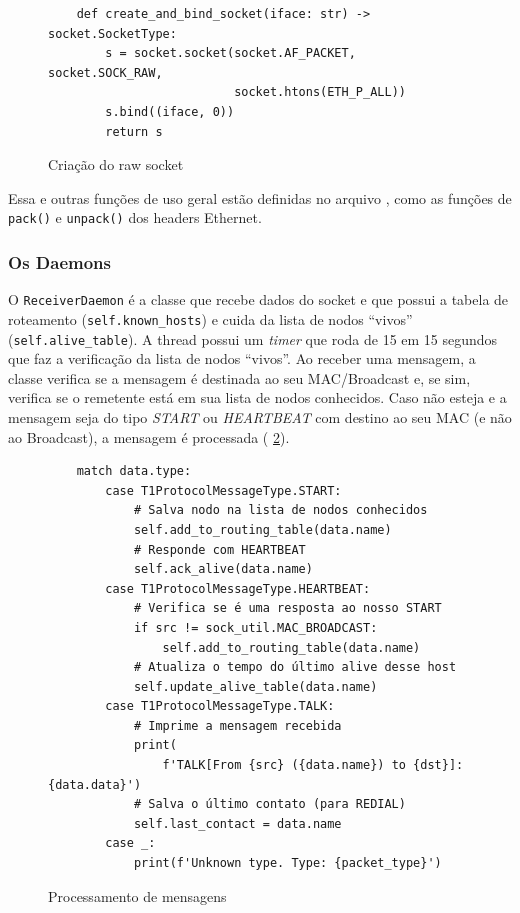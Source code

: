 \begin{figure}[H]
    \centering
\begin{verbatim}
    def create_and_bind_socket(iface: str) -> socket.SocketType:
        s = socket.socket(socket.AF_PACKET, socket.SOCK_RAW,
                          socket.htons(ETH_P_ALL))
        s.bind((iface, 0))
        return s
\end{verbatim}
    \caption{Criação do raw socket}
    \label{fig:create_and_bind_socket}
\end{figure}


Essa e outras funções de uso geral estão definidas no arquivo , como
as funções de \lstinline{pack()} e \lstinline{unpack()} dos headers Ethernet.

\subsubsection{Os Daemons}

O \lstinline{ReceiverDaemon} é a classe que recebe dados do socket e que possui a tabela de roteamento
(\lstinline{self.known_hosts}) e cuida da lista de nodos ``vivos'' (\lstinline{self.alive_table}).
A thread possui um \textit{timer} que roda de 15 em 15 segundos que faz a verificação da lista de nodos ``vivos''.
Ao receber uma mensagem, a classe verifica se a mensagem é destinada ao seu MAC/Broadcast e, se sim, verifica se o remetente
está em sua lista de nodos conhecidos. Caso não esteja e a mensagem seja do tipo \textit{START} ou \textit{HEARTBEAT} com destino ao
seu MAC (e não ao Broadcast), a mensagem é processada (\figurename{ \ref{fig:match_data_type}}).

\begin{figure}[H]
    \centering
\begin{verbatim}
    match data.type:
        case T1ProtocolMessageType.START:
            # Salva nodo na lista de nodos conhecidos
            self.add_to_routing_table(data.name)
            # Responde com HEARTBEAT
            self.ack_alive(data.name)
        case T1ProtocolMessageType.HEARTBEAT:
            # Verifica se é uma resposta ao nosso START
            if src != sock_util.MAC_BROADCAST:
                self.add_to_routing_table(data.name)
            # Atualiza o tempo do último alive desse host
            self.update_alive_table(data.name)
        case T1ProtocolMessageType.TALK:
            # Imprime a mensagem recebida
            print(
                f'TALK[From {src} ({data.name}) to {dst}]: {data.data}')
            # Salva o último contato (para REDIAL)
            self.last_contact = data.name
        case _:
            print(f'Unknown type. Type: {packet_type}')
\end{verbatim}
    \caption{Processamento de mensagens}
    \label{fig:match_data_type}
\end{figure}

